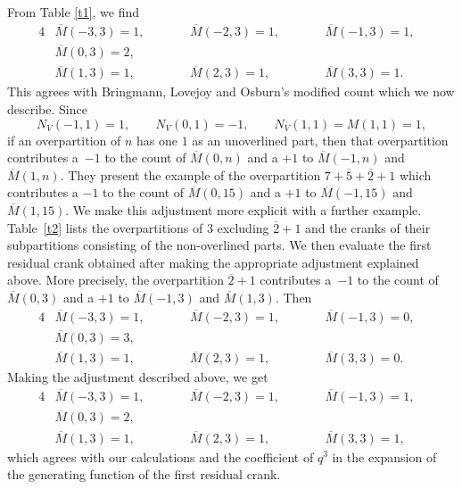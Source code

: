\documentclass[10pt,a4paper]{amsart}
\numberwithin{equation}{section}
\begin{document}
From Table \ref{t1}, we find
\begin{alignat*}{4}
&\overline{M}(-3,3)=1,\qquad&&\overline{M}(-2,3)=1,\qquad&&\overline{M}(-1,3)=1,&
\\
&\overline{M}(0,3)=2,&
\\
&\overline{M}(1,3)=1,\qquad&&\overline{M}(2,3)=1,\qquad&&\overline{M}(3,3)=1.&
\end{alignat*}
This agrees with Bringmann, Lovejoy and Osburn's modified count which we now describe. Since
\begin{equation*}%
N_V(-1,1)=1,\qquad N_V(0,1)=-1,\qquad N_V(1,1)=M(1,1)=1,
\end{equation*}
if an overpartition of $n$ has one $1$ as an unoverlined part, then that overpartition contributes a~$-1$ to the count of $\overline{M}(0,n)$ and a $+1$ to $\overline{M}(-1,n)$ and $\overline{M}(1,n)$.
They present the example of the overpartition $7+\overline{5}+\overline{2}+1$ which contributes a $-1$ to the count of $\overline{M}(0,15)$ and a $+1$ to $\overline{M}(-1,15)$ and $\overline{M}(1,15)$. We make this adjustment more explicit with a further example.
Table~\ref{t2} lists the overpartitions of $3$ excluding $\overline{2}+1$ and the cranks of their subpartitions consisting of the non-overlined parts. We then evaluate the first residual crank obtained after making the appropriate adjustment explained above. More precisely, the overpartition $\overline{2}+1$ contributes a~$-1$ to the count of $\overline{M}(0,3)$ and a $+1$ to $\overline{M}(-1,3)$ and $\overline{M}(1,3)$.
Then
\begin{alignat*}{4}
&\overline{M}(-3,3)=1,\qquad&&\overline{M}(-2,3)=1,\qquad&&\overline{M}(-1,3)=0,&
\\
&\overline{M}(0,3)=3,&
\\
&\overline{M}(1,3)=1,\qquad&&\overline{M}(2,3)=1,\qquad&&\overline{M}(3,3)=0.&
\end{alignat*}
Making the adjustment described above, we get
\begin{alignat*}{4}
&\overline{M}(-3,3)=1,\qquad&&\overline{M}(-2,3)=1,\qquad&&\overline{M}(-1,3)=1,&
\\
&\overline{M}(0,3)=2,&
\\
&\overline{M}(1,3)=1,\qquad&&\overline{M}(2,3)=1,\qquad&&\overline{M}(3,3)=1,&
\end{alignat*}
which agrees with our calculations and the coefficient of $q^3$ in the expansion of the generating function of the first residual crank.
\end{document}
